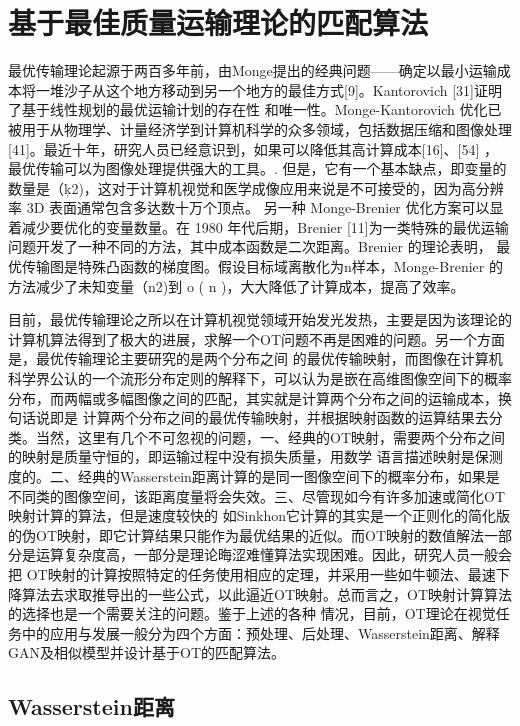 \section{基于最佳质量运输理论的匹配算法}

最优传输理论起源于两百多年前，由Monge提出的经典问题——确定以最小运输成本将一堆沙子从这个地方移动到另一个地方的最佳方式[9]。Kantorovich [31]证明了基于线性规划的最优运输计划的存在性
和唯一性。Monge-Kantorovich 优化已被用于从物理学、计量经济学到计算机科学的众多领域，包括数据压缩和图像处理[41]。最近十年，研究人员已经意识到，如果可以降低其高计算成本[16]、[54] ，
最优传输可以为图像处理提供强大的工具。. 但是，它有一个基本缺点，即变量的数量是（ķ2)，这对于计算机视觉和医学成像应用来说是不可接受的，因为高分辨率 3D 表面通常包含多达数十万个顶点。
另一种 Monge-Brenier 优化方案可以显着减少要优化的变量数量。在 1980 年代后期，Brenier [11]为一类特殊的最优运输问题开发了一种不同的方法，其中成本函数是二次距离。Brenier 的理论表明，
最优传输图是特殊凸函数的梯度图。假设目标域离散化为n样本，Monge-Brenier 的方法减少了未知变量（n2)到 o ( n )，大大降低了计算成本，提高了效率。

目前，最优传输理论之所以在计算机视觉领域开始发光发热，主要是因为该理论的计算机算法得到了极大的进展，求解一个OT问题不再是困难的问题。另一个方面是，最优传输理论主要研究的是两个分布之间
的最优传输映射，而图像在计算机科学界公认的一个流形分布定则的解释下，可以认为是嵌在高维图像空间下的概率分布，而两幅或多幅图像之间的匹配，其实就是计算两个分布之间的运输成本，换句话说即是
计算两个分布之间的最优传输映射，并根据映射函数的运算结果去分类。当然，这里有几个不可忽视的问题，一、经典的OT映射，需要两个分布之间的映射是质量守恒的，即运输过程中没有损失质量，用数学
语言描述映射是保测度的。二、经典的Wasserstein距离计算的是同一图像空间下的概率分布，如果是不同类的图像空间，该距离度量将会失效。三、尽管现如今有许多加速或简化OT映射计算的算法，但是速度较快的
如Sinkhon它计算的其实是一个正则化的简化版的伪OT映射，即它计算结果只能作为最优结果的近似。而OT映射的数值解法一部分是运算复杂度高，一部分是理论晦涩难懂算法实现困难。因此，研究人员一般会把
OT映射的计算按照特定的任务使用相应的定理，并采用一些如牛顿法、最速下降算法去求取推导出的一些公式，以此逼近OT映射。总而言之，OT映射计算算法的选择也是一个需要关注的问题。鉴于上述的各种
情况，目前，OT理论在视觉任务中的应用与发展一般分为四个方面：预处理、后处理、Wasserstein距离、解释GAN及相似模型并设计基于OT的匹配算法。

\subsection{Wasserstein距离}

